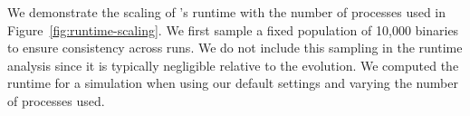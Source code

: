 \documentclass[twocolumn, twocolappendix, oneside, linenumbers]{aastex631}
\begin{document}


We demonstrate the scaling of \cogsworth's runtime with the number of processes used in Figure~\ref{fig:runtime-scaling}. We first sample a fixed population of 10,000 binaries to ensure consistency across runs. We do not include this sampling in the runtime analysis since it is typically negligible relative to the evolution. We computed the runtime for a \cogsworth simulation when using our default settings and varying the number of processes used.
\end{document}

